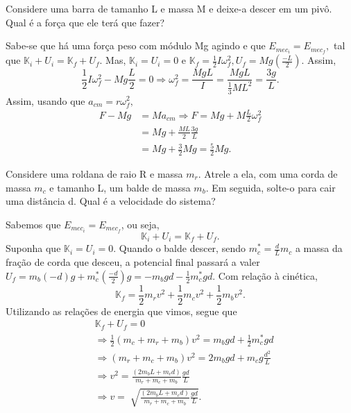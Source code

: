 \documentclass[physicsII_notes.tex]{subfiles}
\begin{document}
\begin{example}
	Considere uma barra de tamanho L e massa M e deixe-a descer em um pivô. Qual é a força que ele terá que fazer?

	Sabe-se que há uma força peso com módulo Mg agindo e que \(E_{mec_{i}} = E_{mec_{f}},\) tal que \(\mathbb{K}_{i} + U_{i} = \mathbb{K}_{f} + U_{f}\).
	Mas, \(\mathbb{K}_{i} = U_{i} = 0\) e \(\mathbb{K}_{f} = \frac{1}{2}I\omega_{f}^{2}, U_{f} = Mg(\frac{-L}{2}).\) Assim,
	\[
		\frac{1}{2}I\omega_{f}^{2} - Mg \frac{L}{2} = 0 \Rightarrow \omega_{f}^{2} = \frac{MgL}{I} = \frac{MgL}{\frac{1}{3}ML^{2}} = \frac{3g}{L}.
	\]
	Assim, usando que \(a_{cm} = r\omega_{f}^{2},\)
	\begin{align*}
		F- Mg & = Ma_{cm} \Rightarrow F = Mg + M \frac{L}{2}\omega_{f}^{2} \\
		      & = Mg + \frac{ML}{2}\frac{3g}{L}                            \\
		      & =Mg + \frac{3}{2}Mg = \frac{5}{2}Mg.
	\end{align*}
\end{example}
\begin{example}
	Considere uma roldana de raio R e massa \(m_{r}\). Atrele a ela, com uma corda de massa \(m_{c}\) e tamanho L, um balde de massa \(m_{b}\).
	Em seguida, solte-o para cair uma distância d. Qual é a velocidade do sistema?

	Sabemos que \(E_{mec_i} = E_{mec_f}\), ou seja,
	\[
		\mathbb{K}_{i} + U_{i} = \mathbb{K}_{f} + U_{f}.
	\]
	Suponha que \(\mathbb{K}_{i} = U_{i} = 0.\) Quando o balde descer, sendo \(m_{c}^{*} = \frac{d}{L}m_{c}\) a massa da fração de corda que desceu, a potencial final passará a valer
	\(U_{f} = m_{b}(-d)g + m_{c}^{*}(\frac{-d}{2})g = -m_{b}gd - \frac{1}{2}m_{c}^{*}gd.\) Com relação à cinética,
	\[
		\mathbb{K}_{f} = \frac{1}{2}m_{r}v^{2} + \frac{1}{2}m_{c}v^{2} + \frac{1}{2}m_{b}v^{2}.
	\]
	Utilizando as relações de energia que vimos, segue que
	\begin{align*}
		 & \mathbb{K}_{f} + U_{f} = 0                                                         \\
		 & \Rightarrow \frac{1}{2}(m_{c}+m_{r}+m_{b})v^{2} = m_{b}gd + \frac{1}{2}m_{c}^{*}gd \\
		 & \Rightarrow (m_{r}+m_{c}+m_{b})v^{2} = 2m_{b}gd + m_{c}g \frac{d^{2}}{L}           \\
		 & \Rightarrow v^{2} = \frac{(2m_{b}L + m_{c}d)}{m_{r}+m_{c}+m_{b}}\frac{gd}{L}       \\
		 & \Rightarrow v = \sqrt[]{\frac{(2m_{b}L + m_{c}d)}{m_{r}+m_{c}+m_{b}}\frac{gd}{L}}.
	\end{align*}
\end{example}
\end{document}
